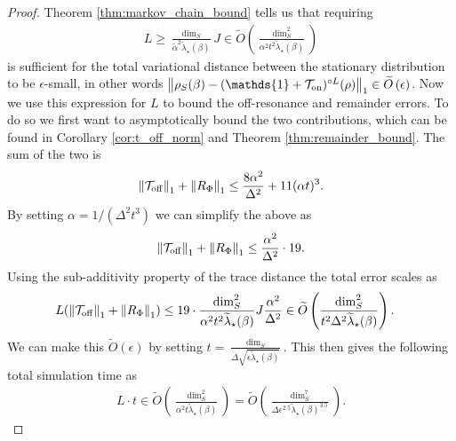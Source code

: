 \documentclass[
 amsmath,amssymb,
 aps,
onecolumn, 
nofootinbib]{revtex4-2}
\newcommand{\on}{\rm on}
\newcommand{\off}{\rm off}
\newcommand{\norm}[1]{\left\| #1 \right\|}
\newcommand{\TT}{\mathcal{T}}
\newcommand{\bigotilde}[1]{\widetilde{O} \left( #1 \right)}
\newcommand{\identity}{\mathds{1}}
\begin{document}
\begin{proof}
    Theorem \ref{thm:markov_chain_bound} tells us that requiring
    \begin{align}
        L \ge \frac{\dim_S}{\widetilde{\alpha}^2 \widetilde{\lambda}_\star(\beta)} J \in \bigotilde{\frac{\dim_S^2}{\alpha^2 t^2 \widetilde{\lambda}_\star(\beta)}}
    \end{align}
    is sufficient for the total variational distance between the stationary distribution to be $\epsilon$-small, in other words $\norm{\rho_S(\beta) - (\identity + \TT_{\on})^{\circ L}(\rho)}_1 \in \bigotilde{\epsilon}$. Now we use this expression for $L$ to bound the off-resonance and remainder errors. To do so we first want to asymptotically bound the two contributions, which can be found in Corollary \ref{cor:t_off_norm} and Theorem \ref{thm:remainder_bound}. The sum of the two is
    \begin{equation}
        \norm{\TT_{\off}}_1 + \norm{R_{\Phi}}_1 \le \frac{8 \alpha^2}{\Delta^2} + 11 (\alpha t)^3.
    \end{equation}
    By setting $\alpha = 1/ (\Delta^2 t^3)$ we can simplify the above as
    \begin{equation}
        \norm{\TT_{\off}}_1 + \norm{R_{\Phi}}_1 \le \frac{\alpha^2}{\Delta^2} \cdot 19.
    \end{equation}
    Using the sub-additivity property of the trace distance the total error scales as
    \begin{align}
        L (\norm{\TT_{\off}}_1 + \norm{R_{\Phi}}_1) &\le 19\cdot\frac{\dim_S^2}{\alpha^2 t^2 \widetilde{\lambda}_\star(\beta)} J \frac{\alpha^2}{\Delta^2}  \in \bigotilde{\frac{\dim_S^2}{t^2 \Delta^2 \widetilde{\lambda}_\star(\beta)}}.
    \end{align}
    We can make this $\bigotilde{\epsilon}$ by setting $t = \frac{\dim_S}{\Delta \sqrt{\epsilon \widetilde{\lambda}_\star(\beta)}}$.
    This then gives the following total simulation time as
    \begin{align}
        L\cdot t \in \bigotilde{\frac{\dim_S^2}{\alpha^2 t \widetilde{\lambda}_\star(\beta)} } = \bigotilde{\frac{\dim_S^7}{\Delta \epsilon^{2.5}   \widetilde{\lambda}_\star(\beta)^{3.5}}}.
    \end{align}
    

\end{proof}
\end{document}
